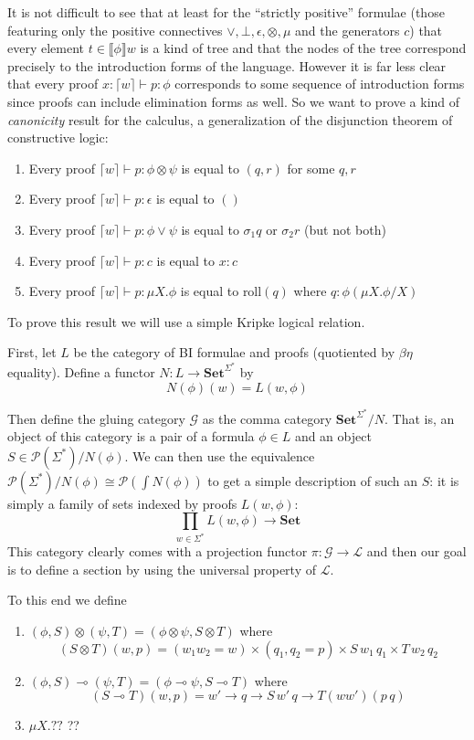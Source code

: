 \documentclass[sigconf,anonymous,review,screen]{acmart}
\newcommand{\Set}{\mathbf{Set}}
\begin{document}
It is not difficult to see that at least for the ``strictly positive''
formulae (those featuring only the positive connectives
$\vee,\bot,\epsilon,\otimes,\mu$ and the generators $c$) that every
element $t \in \llbracket \phi \rrbracket w$ is a kind of tree and
that the nodes of the tree correspond precisely to the introduction
forms of the language. However it is far less clear that every proof
$x:\lceil w \rceil \vdash p : \phi$ corresponds to some sequence of
introduction forms since proofs can include elimination forms as
well. So we want to prove a kind of \emph{canonicity} result for the
calculus, a generalization of the disjunction theorem of constructive
logic:

\begin{enumerate}
\item Every proof $\lceil w \rceil \vdash p : \phi \otimes \psi$ is equal to $(q,r)$ for some $q,r$
\item Every proof $\lceil w \rceil \vdash p : \epsilon$ is equal to $()$
\item Every proof $\lceil w \rceil \vdash p : \phi \vee \psi$ is equal to $\sigma_1q$ or $\sigma_2 r$ (but not both)
\item Every proof $\lceil w \rceil \vdash p : c$ is equal to $x:c$
\item Every proof $\lceil w \rceil \vdash p : \mu X. \phi$ is equal to $\textrm{roll}(q)$ where $q : \phi(\mu X.\phi/X)$
\end{enumerate}

To prove this result we will use a simple Kripke logical relation.

First, let $L$ be the category of BI formulae and proofs (quotiented
by $\beta\eta$ equality). Define a functor $N : L \to \Set^{\Sigma^*}$ by
\[ N(\phi)(w) = L(w,\phi) \]

Then define the gluing category $\mathcal G$ as the comma category
$\Set^{\Sigma^*}/N$. That is, an object of this category is a pair of
a formula $\phi \in L$ and an object $S \in \mathcal
P(\Sigma^*)/N(\phi)$. We can then use the equivalence $\mathcal
P(\Sigma^*)/N(\phi) \cong \mathcal P(\int N(\phi))$ to get a simple
description of such an $S$: it is simply a family of sets indexed by
proofs $L(w,\phi)$:
\[ \prod_{w\in\Sigma^*} L(w,\phi) \to \Set \]
This category clearly comes with a projection functor $\pi : \mathcal
G \to \mathcal L$ and then our goal is to define a section by using
the universal property of $\mathcal L$.

To this end we define
\begin{enumerate}
\item $(\phi, S) \otimes (\psi, T) = (\phi \otimes \psi, S\otimes T)$ where
  \[ (S \otimes T)(w, p) = (w_1w_2 = w) \times (q_1,q_2 = p) \times S\,w_1\,q_1 \times T\,w_2\,q_2\]
\item $(\phi, S) \multimap (\psi, T) = (\phi \multimap \psi, S \multimap T)$ where
  \[ (S \multimap T)(w,p) = w' \to q \to S\,w'\,q \to T (ww') (p\,q) \]
\item $\mu X. ??$ ??
\end{enumerate}
\end{document}
